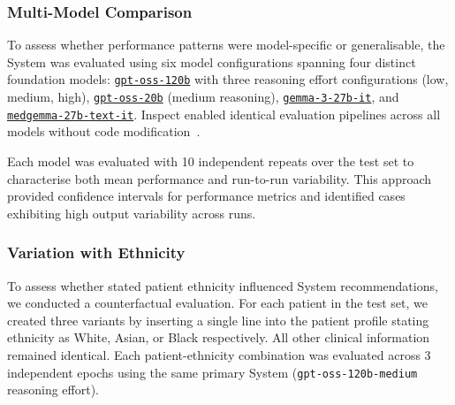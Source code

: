     \subsubsection{Multi-Model Comparison}
        To assess whether performance patterns were model-specific or generalisable, the System was evaluated using six model configurations spanning four distinct foundation models: \href{https://huggingface.co/openai/gpt-oss-120b}{\texttt{gpt-oss-120b}} with three reasoning effort configurations (low, medium, high), \href{https://huggingface.co/openai/gpt-oss-20b}{\texttt{gpt-oss-20b}} (medium reasoning), \href{https://huggingface.co/google/gemma-3-27b-it}{\texttt{gemma-3-27b-it}}, and \href{https://huggingface.co/google/medgemma-27b-text-it}{\texttt{medgemma-27b-text-it}}. Inspect enabled identical evaluation pipelines across all models without code modification~\cite{ukaisecurity2024inspectai}.

        Each model was evaluated with 10 independent repeats over the test set to characterise both mean performance and run-to-run variability. This approach provided confidence intervals for performance metrics and identified cases exhibiting high output variability across runs.

    \subsubsection{Variation with Ethnicity}
        To assess whether stated patient ethnicity influenced System recommendations, we conducted a counterfactual evaluation. For each patient in the test set, we created three variants by inserting a single line into the patient profile stating ethnicity as White, Asian, or Black respectively. All other clinical information remained identical. Each patient-ethnicity combination was evaluated across 3 independent epochs using the same primary System (\texttt{gpt-oss-120b-medium} reasoning effort).